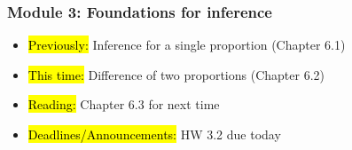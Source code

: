 
\begin{frame}
    \frametitle{Module 3: Foundations for inference}
    \begin{itemize}
        \item \hl{Previously: }Inference for a single proportion (Chapter 6.1)
        \item \hl{This time: }Difference of two proportions (Chapter 6.2)
        \item \hl{Reading: }Chapter 6.3 for next time
        \item \hl{Deadlines/Announcements: }HW 3.2 due today
    \end{itemize}
    
\end{frame}